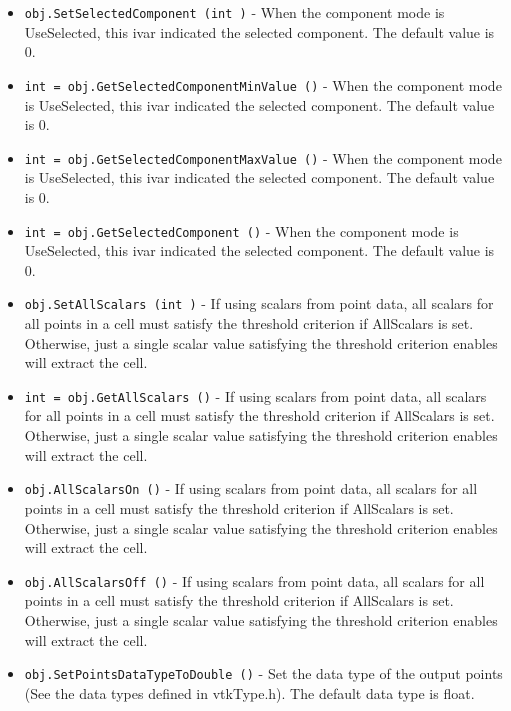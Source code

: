 \begin{itemize}
\item  \verb|obj.SetSelectedComponent (int )| -  When the component mode is UseSelected, this ivar indicated the selected
 component. The default value is 0.

\item  \verb|int = obj.GetSelectedComponentMinValue ()| -  When the component mode is UseSelected, this ivar indicated the selected
 component. The default value is 0.

\item  \verb|int = obj.GetSelectedComponentMaxValue ()| -  When the component mode is UseSelected, this ivar indicated the selected
 component. The default value is 0.

\item  \verb|int = obj.GetSelectedComponent ()| -  When the component mode is UseSelected, this ivar indicated the selected
 component. The default value is 0.

\item  \verb|obj.SetAllScalars (int )| -  If using scalars from point data, all scalars for all points in a cell 
 must satisfy the threshold criterion if AllScalars is set. Otherwise, 
 just a single scalar value satisfying the threshold criterion enables
 will extract the cell.

\item  \verb|int = obj.GetAllScalars ()| -  If using scalars from point data, all scalars for all points in a cell 
 must satisfy the threshold criterion if AllScalars is set. Otherwise, 
 just a single scalar value satisfying the threshold criterion enables
 will extract the cell.

\item  \verb|obj.AllScalarsOn ()| -  If using scalars from point data, all scalars for all points in a cell 
 must satisfy the threshold criterion if AllScalars is set. Otherwise, 
 just a single scalar value satisfying the threshold criterion enables
 will extract the cell.

\item  \verb|obj.AllScalarsOff ()| -  If using scalars from point data, all scalars for all points in a cell 
 must satisfy the threshold criterion if AllScalars is set. Otherwise, 
 just a single scalar value satisfying the threshold criterion enables
 will extract the cell.

\item  \verb|obj.SetPointsDataTypeToDouble ()| -  Set the data type of the output points (See the data types defined in 
 vtkType.h). The default data type is float.


\end{itemize}
